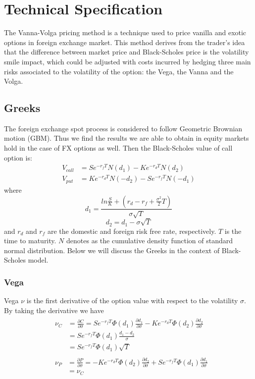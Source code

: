 \chapter{Technical Specification}

The Vanna-Volga pricing method is a technique used to price vanilla and exotic options in foreign exchange market. This method derives from the trader's idea that the difference between market price and Black-Scholes price is the volatility smile impact, which could be adjusted with costs incurred by hedging three main risks associated to the volatility of the option: the Vega, the Vanna and the Volga.

\section{Greeks} 
The foreign exchange spot process is considered to follow Geometric Brownian motion (GBM). Thus we find the results we are able to obtain in equity markets hold in the case of FX options as well. \newline
Then the Black-Scholes value of call option is:
\begin{align}
V_{call} &= Se^{-r_fT}N(d_1) - Ke^{-r_dT}N(d_2) \\
V_{put} &=  Ke^{-r_dT}N(-d_2) - Se^{-r_fT}N(-d_1)
\end{align}
where 
\[d_1 = \frac{ln\frac{S}{K}+\left( r_d - r_f +\frac{\sigma^2}{2}T\right) }{\sigma\sqrt{T}}\]
\[d_2 = d_1 - \sigma \sqrt{T}\]
and $r_d$ and $r_f$ are the domestic and foreign risk free rate, respectively. $T$ is the time to maturity. $N$ denotes as the cumulative density function of standard normal distribution. Below we will discuss the Greeks in the context of Black-Scholes model.

\subsection{Vega}
Vega $\nu$ is the first derivative of the option value with respect to the volatility $\sigma$. 
\newline
\newline
By taking the derivative we have
\begin{align}
&\begin{aligned}
\nu_C &=\frac{\partial C}{\partial \sigma} = Se^{-r_fT}\varPhi(d_1)\frac{\partial d_1}{\partial \sigma}-Ke^{-r_dT}\varPhi(d_2)\frac{\partial d_2}{\partial \sigma}\\
&= Se^{-r_fT}\varPhi(d_1)\frac{d_1 - d_2}{\sigma} \\
&=  Se^{-r_fT}\varPhi(d_1)\sqrt{T}
\end{aligned} \\
&\begin{aligned}
\nu_P &=\frac{\partial P}{\partial \sigma} =-Ke^{-r_dT}\varPhi(d_2)\frac{\partial d_2}{\partial \sigma} + Se^{-r_fT}\varPhi(d_1)\frac{\partial d_1}{\partial \sigma}\\
&= \nu_C 
\end{aligned}
\end{align}

